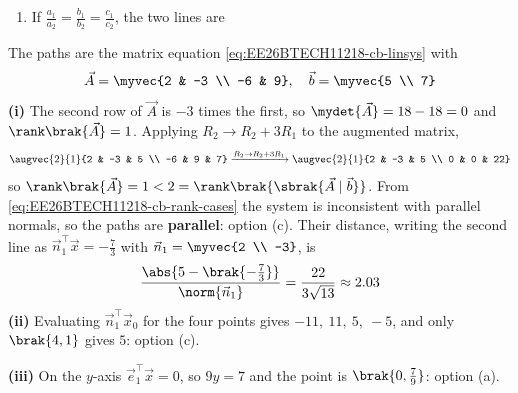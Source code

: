 \begin{enumerate}[label=\thesubsection.\arabic*, ref=\thesubsection.\theenumi,itemsep=1.5em]
\begin{enumerate}[label=(\roman*), itemsep=0pt]
\begin{enumerate}[label=\alph*), itemsep=0pt]
\end{enumerate}
\item If $\frac{a_1}{a_2}=\frac{b_1}{b_2}=\frac{c_1}{c_2}$, the two lines are
\begin{enumerate}[label=\alph*), itemsep=0pt]
\end{enumerate}
\end{enumerate}
\solution
The paths are the matrix equation \eqref{eq:EE26BTECH11218-cb-linsys} with
\begin{align}
\vec{A} = \myvec{2 & -3 \\ -6 & 9}, \quad \vec{b} = \myvec{5 \\ 7}
\end{align}
\textbf{(i)} The second row of $\vec{A}$ is $-3$ times the first, so $\mydet{\vec{A}} = 18-18 = 0$ and $\rank\brak{\vec{A}} = 1$. Applying $R_2 \to R_2+3R_1$ to the augmented matrix,
\begin{align}
\augvec{2}{1}{2 & -3 & 5 \\ -6 & 9 & 7} \xrightarrow{R_2 \to R_2+3R_1} \augvec{2}{1}{2 & -3 & 5 \\ 0 & 0 & 22}
\end{align}
so $\rank\brak{\vec{A}} = 1 < 2 = \rank\brak{\sbrak{\vec{A}\mid\vec{b}}}$. From \eqref{eq:EE26BTECH11218-cb-rank-cases} the system is inconsistent with parallel normals, so the paths are \textbf{parallel}: option (c). Their distance, writing the second line as $\vec{n}_1^{\top}\vec{x}=-\frac{7}{3}$ with $\vec{n}_1 = \myvec{2 \\ -3}$, is
\begin{align}
\frac{\abs{5-\brak{-\frac{7}{3}}}}{\norm{\vec{n}_1}} = \frac{22}{3\sqrt{13}} \approx 2.03
\end{align}
\textbf{(ii)} Evaluating $\vec{n}_1^{\top}\vec{x}_0$ for the four points gives $-11,\ 11,\ 5,\ -5$, and only $\brak{4,1}$ gives $5$: option (c).

\textbf{(iii)} On the $y$-axis $\vec{e}_1^{\top}\vec{x}=0$, so $9y=7$ and the point is $\brak{0,\frac{7}{9}}$: option (a).


\end{enumerate}
